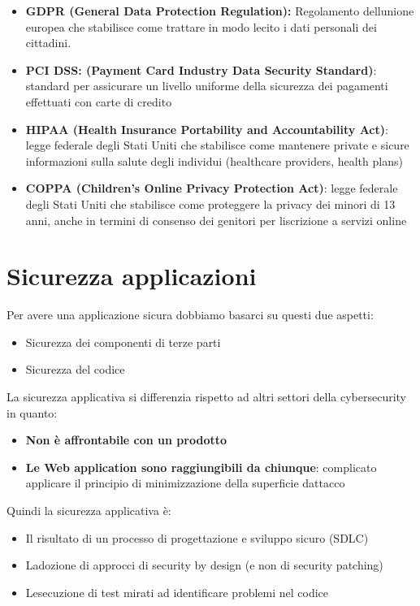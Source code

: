 \begin{itemize}
\item
  \textbf{GDPR (General Data Protection Regulation):} Regolamento
  dell\textquotesingle unione europea che stabilisce come trattare in
  modo lecito i dati personali dei cittadini.
\item
  \textbf{PCI DSS: (Payment Card Industry Data Security Standard)}:
  standard per assicurare un livello uniforme della sicurezza dei
  pagamenti effettuati con carte di credito
\item
  \textbf{HIPAA (Health Insurance Portability and Accountability Act)}:
  legge federale degli Stati Uniti che stabilisce come mantenere private
  e sicure informazioni sulla salute degli individui (healthcare
  providers, health plans)
\item
  \textbf{COPPA (Children's Online Privacy Protection Act)}: legge
  federale degli Stati Uniti che stabilisce come proteggere la privacy
  dei minori di 13 anni, anche in termini di consenso dei genitori per
  l\textquotesingle iscrizione a servizi online
\end{itemize}

\section{Sicurezza applicazioni}\label{sicurezza-applicazioni}

Per avere una applicazione sicura dobbiamo basarci su questi due
aspetti:

\begin{itemize}
\item
  Sicurezza dei componenti di terze parti
\item
  Sicurezza del codice
\end{itemize}

La sicurezza applicativa si differenzia rispetto ad altri settori della
cybersecurity in quanto:

\begin{itemize}
\item
  \textbf{Non è affrontabile con un prodotto}
\item
  \textbf{Le Web application sono raggiungibili da chiunque}: complicato
  applicare il principio di minimizzazione della superficie
  d\textquotesingle attacco
\end{itemize}

Quindi la sicurezza applicativa è:

\begin{itemize}
\item
  Il risultato di un processo di progettazione e sviluppo sicuro (SDLC)
\item
  L\textquotesingle adozione di approcci di security by design (e non di
  security patching)
\item
  L\textquotesingle esecuzione di test mirati ad identificare problemi
  nel codice
\end{itemize}

